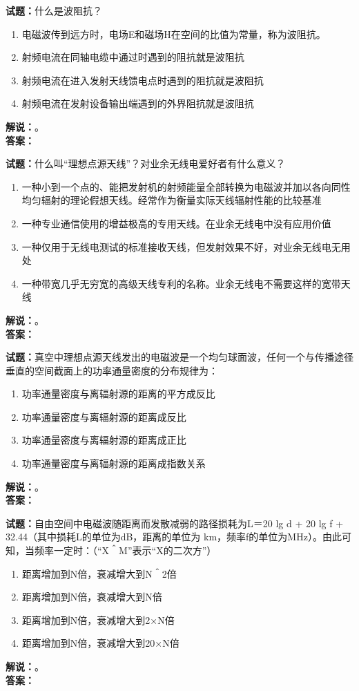 \documentclass{ctexbook}
\begin{document}
\noindent\textbf{试题：}什么是波阻抗？
\begin{enumerate}[leftmargin=3em]
  \item 电磁波传到远方时，电场E和磁场H在空间的比值为常量，称为波阻抗。
  \item 射频电流在同轴电缆中通过时遇到的阻抗就是波阻抗
  \item 射频电流在进入发射天线馈电点时遇到的阻抗就是波阻抗
  \item 射频电流在发射设备输出端遇到的外界阻抗就是波阻抗
\end{enumerate}
\noindent\textbf{解说：}\textbf{}。\\\noindent\textbf{答案：}

\bigskip

\noindent\textbf{试题：}什么叫“理想点源天线”？对业余无线电爱好者有什么意义？
\begin{enumerate}[leftmargin=3em]
  \item 一种小到一个点的、能把发射机的射频能量全部转换为电磁波并加以各向同性均匀辐射的理论假想天线。经常作为衡量实际天线辐射性能的比较基准
  \item 一种专业通信使用的增益极高的专用天线。在业余无线电中没有应用价值
  \item 一种仅用于无线电测试的标准接收天线，但发射效果不好，对业余无线电无用处
  \item 一种带宽几乎无穷宽的高级天线专利的名称。业余无线电不需要这样的宽带天线
\end{enumerate}
\noindent\textbf{解说：}\textbf{}。\\\noindent\textbf{答案：}

\bigskip

\noindent\textbf{试题：}真空中理想点源天线发出的电磁波是一个均匀球面波，任何一个与传播途径垂直的空间截面上的功率通量密度的分布规律为：
\begin{enumerate}[leftmargin=3em]
  \item 功率通量密度与离辐射源的距离的平方成反比
  \item 功率通量密度与离辐射源的距离成反比
  \item 功率通量密度与离辐射源的距离成正比
  \item 功率通量密度与离辐射源的距离成指数关系
\end{enumerate}
\noindent\textbf{解说：}\textbf{}。\\\noindent\textbf{答案：}

\bigskip

\noindent\textbf{试题：}自由空间中电磁波随距离而发散减弱的路径损耗为L＝20 lg d + 20 lg f + 32.44（其中损耗L的单位为dB，距离的单位为 km，频率f的单位为\unit{\MHz}）。由此可知，当频率一定时：（“X＾M”表示“X的二次方”）
\begin{enumerate}[leftmargin=3em]
  \item 距离增加到N倍，衰减增大到N＾2倍
  \item 距离增加到N倍，衰减增大到N倍
  \item 距离增加到N倍，衰减增大到2×N倍
  \item 距离增加到N倍，衰减增大到20×N倍
\end{enumerate}
\noindent\textbf{解说：}\textbf{}。\\\noindent\textbf{答案：}
\end{document}
